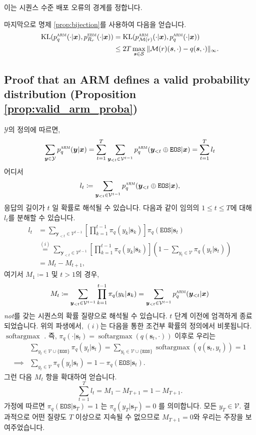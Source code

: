 \documentclass{article}
\def\s{{\bm{s}}}
\def\x{{\bm{x}}}
\def\y{{\bm{y}}}
\def\cM{{\mathcal{M}}}
\def\cS{{\mathcal{S}}}
\def\cV{{\mathcal{V}}}
\def\cY{{\mathcal{Y}}}
\newcommand{\Rsub}[1]{R_{#1}}
\def\arm{{\textsc{arm}}}
\def\ebm{{\textsc{ebm}}}
\def\softargmax{{\operatorname{softargmax}}}
\def\KL{{\mathrm{KL}}}
\def\eos{\texttt{EOS}\xspace}
\def\voc{\cV}
\begin{document}
이는 시퀀스 수준 배포 오류의 경계를 정합니다.

마지막으로 명제 \ref{prop:bijection}를 사용하여 다음을 얻습니다.
 \begin{align} 
 \KL (p^ \arm _q( \cdot | \x ), p^ \ebm _{ \Rsub{r} }( \cdot | \x ))
&= \KL (p^ \arm _{ \cM (r)}( \cdot | \x ), p^ \arm _q( \cdot | \x )) \\
& \le 2T \max _{ \s \in \cS } \| \cM (r)( \s , \cdot ) - q( \s , \cdot )\|_ \infty .
 \end{align}

\subsection{Proof that an ARM defines a valid probability distribution
(Proposition \ref{prop:valid_arm_proba})} 
 \label{proof:valid_arm_proba}

$\cY$의 정의에 따르면, 
 \begin{equation} 
 \sum _{ \y \in \cY } p^ \arm _q( \y | \x ) = \sum _{t=1}^T 
 \sum _{ \y _{<t} \in \voc ^{t-1}} p^ \arm _q( \y _{<t} \oplus \eos | \x ) = \sum _{t=1}^T l_t
 \end{equation}  
어디서
\[
l_t \coloneqq \sum _{ \y _{<t} \in \voc ^{t-1}} p^ \arm _q( \y _{<t} \oplus \eos | \x ),
\]
응답의 길이가 $t$ 일 확률로 해석될 수 있습니다.
다음과 같이 임의의 $1 \leq t \leq T$에 대해 $l_t$를 분해할 수 있습니다.
 \begin{align} 
l_t 
& = \sum _{ \y _{<t} \in \voc ^{t-1}} \left [ \prod _{k=1}^{t-1} \pi _q(y_k| \s _k) \right ] \pi _q( \eos | \s _t) \\
& \stackrel{(i)} {=} 
 \sum _{ \y _{<t} \in \voc ^{t-1}} \left [ \prod _{k=1}^{t-1} \pi _q(y_k| \s _k) \right ] \left (1 - \sum _{y_t \in \cV } \pi _q(y_t| \s _t) \right ) \\
& = M_t - M_{t+1},
 \end{align} 
여기서 $M_1\coloneqq1$ 및 $t>1$의 경우,
\[
M_t \coloneqq \sum _{ \y _{<t} \in \voc ^{t-1}} \prod _{k=1}^{t-1} \pi _q(y_k| \s _k)
= \sum _{ \y _{<t} \in \voc ^{t-1}} p_q^ \arm ( \y _{<t}| \x ) 
\]
\textit{not}를 갖는 시퀀스의 확률 질량으로 해석될 수 있습니다. 
$t$ 단계 이전에 엄격하게 종료되었습니다.  위의 파생에서,
 $(i)$는 다음을 통한 조건부 확률의 정의에서 비롯됩니다.
 $\softargmax$ . 즉, $\pi_q(\cdot |\s_t) = \softargmax (q(\s_t,
\cdot))$ 이후로 우리는
 \begin{align} 
& \sum _{y_t \in \voc \cup \{ \eos \}} \pi _q(y_t| \s _t) = \sum _{y_t \in \voc \cup \{ \eos \}} \softargmax (q( \s _t, y_t)) = 1 \\
 \implies & \sum _{y_t \in \voc } \pi _q(y_t| \s _t) = 1 - \pi _q( \eos | \s _t).
 \end{align} 
그런 다음 $M_t$ 항을 확대하여 얻습니다. 
 \begin{equation} 
 \sum _{t=1}^T l_t = M_1 - M_{T+1} = 1 - M_{T+1}.
 \end{equation} 
가정에 따르면 $\pi_q(\eos|\s_T) = 1$ 는 $\pi_q(y_T|\s_T) = 0$ 를 의미합니다.
모든 $y_T \in \voc$. 결과적으로 어떤 질량도 $T$ 이상으로 지속될 수 없으므로 $M_{T+1} =
0$와 우리는 주장을 보여주었습니다.
\end{document}
